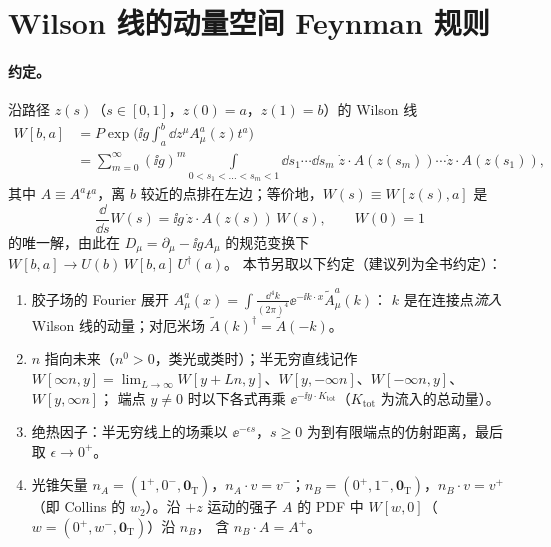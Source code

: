 \section{Wilson 线的动量空间 Feynman 规则}\label{sec:cw-rules}

\paragraph{约定。}
沿路径 $z(s)$（$s\in[0,1]$，$z(0)=a$，$z(1)=b$）的 Wilson 线
\begin{equation}\label{eq:cw-W}
\begin{aligned}
W[b,a]&=P\exp\Big(\ii g\int_a^b\dd z^\mu A^a_\mu(z)t^a\Big)\\
&=\sum_{m=0}^\infty(\ii g)^m\int\limits_{0<s_1<\dots<s_m<1}\dd s_1\cdots\dd s_m\;
\dot z\cdot A(z(s_m))\cdots\dot z\cdot A(z(s_1)),
\end{aligned}
\end{equation}
其中 $A\equiv A^at^a$，离 $b$ 较近的点排在左边；等价地，$W(s)\equiv W[z(s),a]$ 是
\[
\frac{\dd}{\dd s}W(s)=\ii g\,\dot z\cdot A(z(s))\,W(s),\qquad W(0)=1
\]
的唯一解，由此在 $D_\mu=\partial_\mu-\ii gA_\mu$ 的规范变换下 $W[b,a]\to U(b)\,W[b,a]\,U^\dagger(a)$。
本节另取以下约定（建议列为全书约定）：
\begin{enumerate}[label=(C\arabic*),leftmargin=3.2em]
\item 胶子场的 Fourier 展开 $A^a_\mu(x)=\int\frac{\dd^4k}{(2\pi)^4}\ee^{-\ii k\cdot x}\tilde A^a_\mu(k)$：
      $k$ 是在连接点\emph{流入} Wilson 线的动量；对厄米场 $\tilde A(k)^\dagger=\tilde A(-k)$。
\item $n$ 指向未来（$n^0>0$，类光或类时）；半无穷直线记作
      $W[\infty n,y]=\lim_{L\to\infty}W[y+Ln,y]$、$W[y,-\infty n]$、$W[-\infty n,y]$、$W[y,\infty n]$；
      端点 $y\neq0$ 时以下各式再乘 $\ee^{-\ii y\cdot K_{\mathrm{tot}}}$（$K_{\mathrm{tot}}$ 为流入的总动量）。
\item 绝热因子：半无穷线上的场乘以 $\ee^{-\epsilon s}$，$s\geq0$ 为到有限端点的仿射距离，最后取 $\epsilon\to0^+$。
\item 光锥矢量 $n_A=(1^+,0^-,\bm 0_{\mathrm T})$，$n_A\cdot v=v^-$；$n_B=(0^+,1^-,\bm 0_{\mathrm T})$，$n_B\cdot v=v^+$
      （即 Collins 的 $w_2$）。沿 $+z$ 运动的强子 $A$ 的 PDF 中 $W[w,0]$（$w=(0^+,w^-,\bm 0_{\mathrm T})$）沿 $n_B$，
      含 $n_B\cdot A=A^+$。
\end{enumerate}

